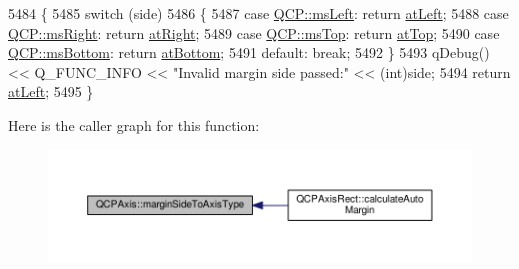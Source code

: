 \begin{DoxyCode}
5484 \{
5485   \textcolor{keywordflow}{switch} (side)
5486   \{
5487     \textcolor{keywordflow}{case} \hyperlink{namespace_q_c_p_a7e487e3e2ccb62ab7771065bab7cae54a9500c8bfcc9e80b9dff0a8e00e867f07}{QCP::msLeft}: \textcolor{keywordflow}{return} \hyperlink{class_q_c_p_axis_ae2bcc1728b382f10f064612b368bc18aaf84aa6cac6fb6099f54a2cbf7546b730}{atLeft};
5488     \textcolor{keywordflow}{case} \hyperlink{namespace_q_c_p_a7e487e3e2ccb62ab7771065bab7cae54a93c719593bb2b94ed244d52c86d83b65}{QCP::msRight}: \textcolor{keywordflow}{return} \hyperlink{class_q_c_p_axis_ae2bcc1728b382f10f064612b368bc18aadf5509f7d29199ef2f263b1dd224b345}{atRight};
5489     \textcolor{keywordflow}{case} \hyperlink{namespace_q_c_p_a7e487e3e2ccb62ab7771065bab7cae54a5db8fb0d0b0ecf0d611c2602a348e8a0}{QCP::msTop}: \textcolor{keywordflow}{return} \hyperlink{class_q_c_p_axis_ae2bcc1728b382f10f064612b368bc18aac0ece2b680d3f545e701f75af1655977}{atTop};
5490     \textcolor{keywordflow}{case} \hyperlink{namespace_q_c_p_a7e487e3e2ccb62ab7771065bab7cae54a5241d8eac2bab9524a38889f576179cc}{QCP::msBottom}: \textcolor{keywordflow}{return} \hyperlink{class_q_c_p_axis_ae2bcc1728b382f10f064612b368bc18aa220d68888516b6c3b493d144f1ba438f}{atBottom};
5491     \textcolor{keywordflow}{default}: \textcolor{keywordflow}{break};
5492   \}
5493   qDebug() << Q\_FUNC\_INFO << \textcolor{stringliteral}{"Invalid margin side passed:"} << (int)side;
5494   \textcolor{keywordflow}{return} \hyperlink{class_q_c_p_axis_ae2bcc1728b382f10f064612b368bc18aaf84aa6cac6fb6099f54a2cbf7546b730}{atLeft};
5495 \}
\end{DoxyCode}


Here is the caller graph for this function\+:\nopagebreak
\begin{figure}[H]
\begin{center}
\leavevmode
\includegraphics[width=350pt]{class_q_c_p_axis_ac0a6b77bd52bec6c81cd62d167cfeba6_icgraph}
\end{center}
\end{figure}


\hypertarget{class_q_c_p_axis_a18f3a68f2b691af1fd34b6593c886630}{}
